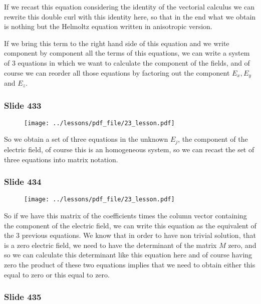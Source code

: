 \documentclass[../main/main.tex]{subfiles}
\begin{document}
If we recast this equation considering the identity of the vectorial calculus we can rewrite this double curl with this identity here, so that in the end what we obtain is nothing but the Helmoltz equation written in anisotropic version.

If we bring this term to the right hand side of this equation and we write component by component all the terms of this equations, we can write a system of 3 equations in which we want to calculate the component of the fields, and of course we can reorder all those equations by factoring out the component $E_x, E_y$ and $E_z$. 

\newpage

\subsubsection{Slide 433}

\begin{figure}[h!]
\centering
\texttt{[image: ../lessons/pdf\_file/23\_lesson.pdf]}
\end{figure}

So we obtain a set of three equations in the unknown $E_j$, the component of the electric field, of course this is an homogeneous system, so we can recast the set of three equations into matrix notation.

\newpage

\subsubsection{Slide 434}

\begin{figure}[h!]
\centering
\texttt{[image: ../lessons/pdf\_file/23\_lesson.pdf]}
\end{figure}

So if we have this matrix of the coefficients times the column vector containing the component of the electric field, we can write this equation as the equivalent of the 3 previous equations. We know that in order to have non trivial solution, that is a zero electric field, we need to have the determinant of the matrix $M$ zero, and so we can calculate this determinant like this equation here and of course having zero the product of these two equations implies that we need to obtain either this equal to zero or this equal to zero.

\newpage

\subsubsection{Slide 435}
\end{document}
